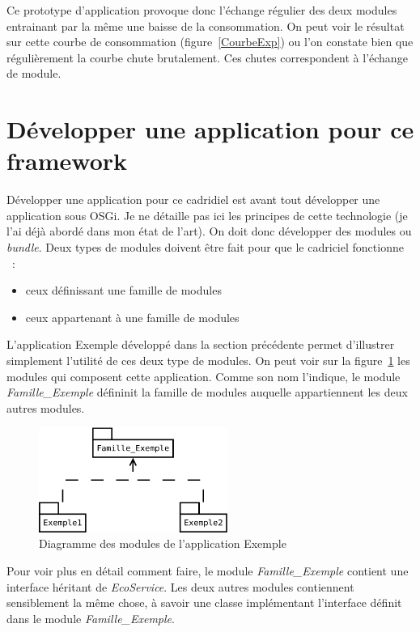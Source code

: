 \documentclass[a4paper, 11pt]{report}
\begin{document}
Ce prototype d'application provoque donc l'échange régulier des deux modules entrainant par la même une baisse de la consommation. On peut voir le résultat sur cette courbe de consommation (figure~\ref{CourbeExp}) ou l'on constate bien que régulièrement la courbe chute brutalement. Ces chutes correspondent à l'échange de module.

	\section{Développer une application pour ce framework}
Développer une application pour ce cadridiel est avant tout développer une application sous OSGi. Je ne détaille pas ici les principes de cette technologie (je l'ai déjà abordé dans mon état de l'art). On doit donc développer des modules ou \textit{bundle}. Deux types de modules doivent être fait pour que le cadriciel fonctionne ~:
\begin{itemize}
  \item ceux définissant une famille de modules
  \item ceux appartenant à une famille de modules
\end{itemize}

L'application Exemple développé dans la section précédente permet d'illustrer simplement l'utilité de ces deux type de modules. On peut voir sur la figure~\ref{BdlExp} les modules qui composent cette application. Comme son nom l'indique, le module \textit{Famille\_Exemple} défininit la famille de modules auquelle appartiennent les deux autres modules.

\begin{figure}
	\centering
	\includegraphics[width=0.55\textwidth]{figures/EcoPattern_Exemple}
	\caption{Diagramme des modules de l'application Exemple}
	\label{BdlExp}
\end{figure}

Pour voir plus en détail comment faire, le module \textit{Famille\_Exemple} contient une interface héritant de \textit{EcoService}. Les deux autres modules contiennent sensiblement la même chose, à savoir une classe implémentant l'interface définit dans le module \textit{Famille\_Exemple}.
\end{document}
